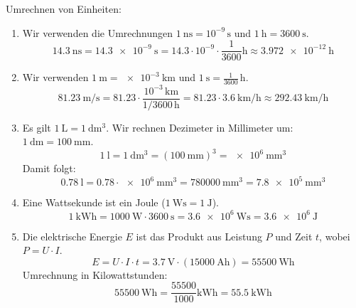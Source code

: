 \documentclass[ngerman]{scrreprt}
\newenvironment{loesungbox}[1]
  {\needspace{5\baselineskip}\begin{loesungboxstyle}[frametitle={#1}]}
  {\end{loesungboxstyle}}
\begin{document}
\begin{loesungbox}{Lösung zu \Cref{aufg:umrechnung_einheiten}}
Umrechnen von Einheiten:
\begin{enumerate}
    \item Wir verwenden die Umrechnungen $\SI{1}{\nano\second} = 10^{-9}\,\si{\second}$ und $\SI{1}{\hour} = \SI{3600}{\second}$.
    \begin{equation}
        \SI{14.3}{\nano\second} = \SI{14.3e-9}{\second} = \num{14.3} \cdot 10^{-9} \cdot \frac{1}{3600}\si{\hour} \approx \SI{3.972e-12}{\hour}
    \end{equation}

    \item Wir verwenden $\SI{1}{\meter} = \SI{e-3}{\kilo\meter}$ und $\SI{1}{\second} = \frac{1}{3600}\,\si{\hour}$.
    \begin{equation}
        \SI{81.23}{\meter\per\second} = \num{81.23} \cdot \frac{10^{-3}\,\si{\kilo\meter}}{1/3600\,\si{\hour}} = \num{81.23} \cdot \SI{3.6}{\kilo\meter\per\hour} \approx \SI{292.43}{\kilo\meter\per\hour}
    \end{equation}

    \item Es gilt $\SI{1}{\liter} = \SI{1}{\deci\meter\cubed}$. Wir rechnen Dezimeter in Millimeter um: $\SI{1}{\deci\meter} = \SI{100}{\milli\meter}$.
    \begin{equation}
        \SI{1}{\litre} = \SI{1}{\deci\meter\cubed} = (\SI{100}{\milli\meter})^3 = \SI{e6}{\milli\meter\cubed}
    \end{equation}
    Damit folgt:
    \begin{equation}
        \SI{0.78}{\litre} = \num{0.78} \cdot \SI{e6}{\milli\meter\cubed} = \SI{780000}{\milli\meter\cubed} = \SI{7.8e5}{\milli\meter\cubed}
    \end{equation}

    \item Eine Wattsekunde ist ein Joule ($\SI{1}{\watt\second} = \SI{1}{\joule}$).
    \begin{equation}
        \SI{1}{\kWh} = \SI{1000}{\watt} \cdot \SI{3600}{\second} = \SI{3.6e6}{\watt\second} = \SI{3.6e6}{\joule}
    \end{equation}

    \item Die elektrische Energie $E$ ist das Produkt aus Leistung $P$ und Zeit $t$, wobei $P=U \cdot I$.
    \begin{equation}
        E = U \cdot I \cdot t = \SI{3,7}{\volt} \cdot (\SI{15000}{\ampere\hour}) = \SI{55500}{\watt\hour}
    \end{equation}
    Umrechnung in Kilowattstunden:
    \begin{equation}
        \SI{55500}{\watt\hour} = \frac{\num{55500}}{\num{1000}} \si{\kilo\watt\hour} = \SI{55.5}{\kilo\watt\hour}
    \end{equation}


\end{enumerate}
\end{loesungbox}
\end{document}
